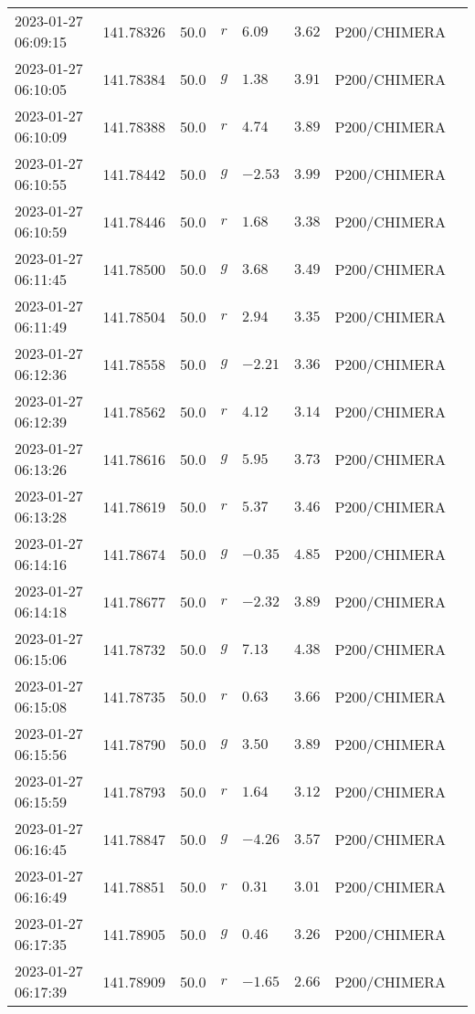 \documentclass{nature_plusfigure}
\begin{document}
\begin{supplement}
\begin{center}
\begin{longtable}{llllllll}
2023-01-27 06:09:15 & 141.78326 & 50.0 & $r$ & $6.09$ & $3.62$ & P200/CHIMERA &  \\ 
2023-01-27 06:10:05 & 141.78384 & 50.0 & $g$ & $1.38$ & $3.91$ & P200/CHIMERA &  \\ 
2023-01-27 06:10:09 & 141.78388 & 50.0 & $r$ & $4.74$ & $3.89$ & P200/CHIMERA &  \\ 
2023-01-27 06:10:55 & 141.78442 & 50.0 & $g$ & $-2.53$ & $3.99$ & P200/CHIMERA &  \\ 
2023-01-27 06:10:59 & 141.78446 & 50.0 & $r$ & $1.68$ & $3.38$ & P200/CHIMERA &  \\ 
2023-01-27 06:11:45 & 141.78500 & 50.0 & $g$ & $3.68$ & $3.49$ & P200/CHIMERA &  \\ 
2023-01-27 06:11:49 & 141.78504 & 50.0 & $r$ & $2.94$ & $3.35$ & P200/CHIMERA &  \\ 
2023-01-27 06:12:36 & 141.78558 & 50.0 & $g$ & $-2.21$ & $3.36$ & P200/CHIMERA &  \\ 
2023-01-27 06:12:39 & 141.78562 & 50.0 & $r$ & $4.12$ & $3.14$ & P200/CHIMERA &  \\ 
2023-01-27 06:13:26 & 141.78616 & 50.0 & $g$ & $5.95$ & $3.73$ & P200/CHIMERA &  \\ 
2023-01-27 06:13:28 & 141.78619 & 50.0 & $r$ & $5.37$ & $3.46$ & P200/CHIMERA &  \\ 
2023-01-27 06:14:16 & 141.78674 & 50.0 & $g$ & $-0.35$ & $4.85$ & P200/CHIMERA &  \\ 
2023-01-27 06:14:18 & 141.78677 & 50.0 & $r$ & $-2.32$ & $3.89$ & P200/CHIMERA &  \\ 
2023-01-27 06:15:06 & 141.78732 & 50.0 & $g$ & $7.13$ & $4.38$ & P200/CHIMERA &  \\ 
2023-01-27 06:15:08 & 141.78735 & 50.0 & $r$ & $0.63$ & $3.66$ & P200/CHIMERA &  \\ 
2023-01-27 06:15:56 & 141.78790 & 50.0 & $g$ & $3.50$ & $3.89$ & P200/CHIMERA &  \\ 
2023-01-27 06:15:59 & 141.78793 & 50.0 & $r$ & $1.64$ & $3.12$ & P200/CHIMERA &  \\ 
2023-01-27 06:16:45 & 141.78847 & 50.0 & $g$ & $-4.26$ & $3.57$ & P200/CHIMERA &  \\ 
2023-01-27 06:16:49 & 141.78851 & 50.0 & $r$ & $0.31$ & $3.01$ & P200/CHIMERA &  \\ 
2023-01-27 06:17:35 & 141.78905 & 50.0 & $g$ & $0.46$ & $3.26$ & P200/CHIMERA &  \\ 
2023-01-27 06:17:39 & 141.78909 & 50.0 & $r$ & $-1.65$ & $2.66$ & P200/CHIMERA &  \\ 

\end{longtable}
\end{center}
\end{supplement}
\end{document}
